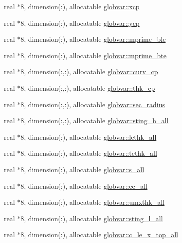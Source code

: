 \begin{DoxyCompactItemize}
real $\ast$8, dimension(\+:), allocatable \hyperlink{namespaceglobvar_a2261b8999031669b2d4002de587e1017}{globvar\+::xcp}
\item 
real $\ast$8, dimension(\+:), allocatable \hyperlink{namespaceglobvar_aceb6425a62e3d2fa8d2f17f17d83e558}{globvar\+::ycp}
\item 
real $\ast$8, dimension(\+:), allocatable \hyperlink{namespaceglobvar_ae10e04d6629f2c844f1e0613142003da}{globvar\+::mprime\+\_\+ble}
\item 
real $\ast$8, dimension(\+:), allocatable \hyperlink{namespaceglobvar_a6efd6498d9aae9dcb41000cdd23ddf73}{globvar\+::mprime\+\_\+bte}
\item 
real $\ast$8, dimension(\+:,\+:), allocatable \hyperlink{namespaceglobvar_a533758dc33d13c7f7d7fc3b2c1b14f2b}{globvar\+::curv\+\_\+cp}
\item 
real $\ast$8, dimension(\+:,\+:), allocatable \hyperlink{namespaceglobvar_a621e5e0db93b47d60b4a804c9fe96ac2}{globvar\+::thk\+\_\+cp}
\item 
real $\ast$8, dimension(\+:,\+:), allocatable \hyperlink{namespaceglobvar_aca37141a129c261c28872a486944fece}{globvar\+::sec\+\_\+radius}
\item 
real $\ast$8, dimension(\+:,\+:), allocatable \hyperlink{namespaceglobvar_afab867a5ed560efb35549138a3645ead}{globvar\+::sting\+\_\+h\+\_\+all}
\item 
real $\ast$8, dimension(\+:), allocatable \hyperlink{namespaceglobvar_ac8f321181d3578817641ebd2f3ecfce3}{globvar\+::lethk\+\_\+all}
\item 
real $\ast$8, dimension(\+:), allocatable \hyperlink{namespaceglobvar_a0e616405e514a293d4730e14ff716027}{globvar\+::tethk\+\_\+all}
\item 
real $\ast$8, dimension(\+:), allocatable \hyperlink{namespaceglobvar_ad577edfa4a4ef2f6d3bb184a4e0931b1}{globvar\+::s\+\_\+all}
\item 
real $\ast$8, dimension(\+:), allocatable \hyperlink{namespaceglobvar_a7037a7dd30b11e09190ebb70e483c63f}{globvar\+::ee\+\_\+all}
\item 
real $\ast$8, dimension(\+:), allocatable \hyperlink{namespaceglobvar_a1e3e80a1760c544775d54a22dc950fef}{globvar\+::umxthk\+\_\+all}
\item 
real $\ast$8, dimension(\+:), allocatable \hyperlink{namespaceglobvar_a598b9f7682973868c54d34e1a05ad030}{globvar\+::sting\+\_\+l\+\_\+all}
\item 
real $\ast$8, dimension(\+:), allocatable \hyperlink{namespaceglobvar_a402f13249e098adf069fdb47247cc952}{globvar\+::c\+\_\+le\+\_\+x\+\_\+top\+\_\+all}

\end{DoxyCompactItemize}
